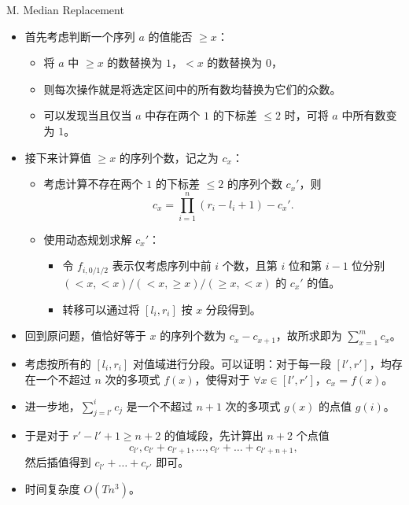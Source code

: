 \documentclass[9pt]{ctexbeamer}
\newcommand{\setParDis}{\setlength{\parskip}{6pt}}
\begin{document}
\begin{frame}
\setParDis

M. Median Replacement

\begin{itemize}
	\item 首先考虑判断一个序列 $a$ 的值能否 $\ge x$：
		\begin{itemize}
			\item 将 $a$ 中 $\ge x$ 的数替换为 $1$，$<x$ 的数替换为 $0$，
			\item 则每次操作就是将选定区间中的所有数均替换为它们的众数。
			\item 可以发现当且仅当 $a$ 中存在两个 $1$ 的下标差 $\le 2$ 时，可将 $a$ 中所有数变为 $1$。
		\end{itemize}
	\item 接下来计算值 $\ge x$ 的序列个数，记之为 $c_x$：
		\begin{itemize}
			\item 考虑计算不存在两个 $1$ 的下标差 $\le 2$ 的序列个数 $c_x'$，则 \[c_x=\prod\limits_{i=1}^n(r_i-l_i+1)-c_x'.\]
			\item 使用动态规划求解 $c_x'$：
				\begin{itemize}
					\item 令 $f_{i,0/1/2}$ 表示仅考虑序列中前 $i$ 个数，且第 $i$ 位和第 $i-1$ 位分别 $(<x,<x)/(<x,\ge x)/(\ge x,<x)$ 的 $c_x'$ 的值。
					\item 转移可以通过将 $[l_i, r_i]$ 按 $x$ 分段得到。
				\end{itemize}
		\end{itemize}
\end{itemize}

\end{frame}

\begin{frame}
\setParDis

\begin{itemize}
	\item 回到原问题，值恰好等于 $x$ 的序列个数为 $c_x-c_{x+1}$，故所求即为 $\sum\limits_{x=1}^mc_x$。
	\item 考虑按所有的 $[l_i, r_i]$ 对值域进行分段。可以证明：对于每一段 $[l', r']$，均存在一个不超过 $n$ 次的多项式 $f(x)$，使得对于 $\forall x \in [l', r']$，$c_x = f(x)$。
	\item 进一步地，$\sum_{j = l'} ^ i c_j$ 是一个不超过 $n + 1$ 次的多项式 $g(x)$ 的点值 $g(i)$。
	\item 于是对于 $r' - l' + 1 \ge n + 2$ 的值域段，先计算出 $n + 2$ 个点值 \[c_{l'}, c_{l'} + c_{l' + 1}, \dots, c_{l'} + \dots + c_{l' + n + 1},\] 然后插值得到 $c_{l'} + \dots + c_{r'}$ 即可。
	\item 时间复杂度 $O(T n ^ 3)$。
\end{itemize}

\end{frame}
\end{document}
